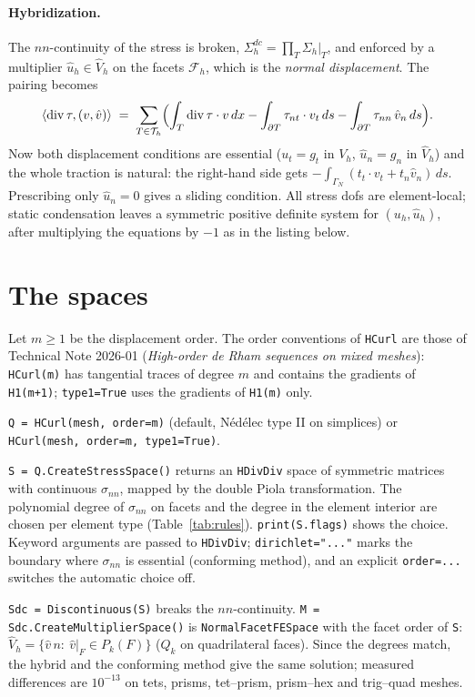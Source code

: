 \documentclass[10pt,a4paper]{article}
\newcommand{\code}[1]{\texttt{#1}}
\newcommand{\Th}{\mathcal{T}_h}
\newcommand{\Fh}{\mathcal{F}_h}
\newcommand{\Div}{\operatorname{div}}
\begin{document}
\paragraph{Hybridization.}
The $nn$-continuity of the stress is broken, $\Sigma_h^{dc}=\prod_T\Sigma_h|_T$, and enforced by a multiplier $\hat u_h\in\hat V_h$ on the facets $\Fh$, which is the \emph{normal displacement}. The pairing becomes
\[
  \langle\Div\tau,(v,\hat v)\rangle \;=\; \sum_{T\in\Th}\Bigl(\int_T \Div\tau\cdot v\,dx - \int_{\partial T}\tau_{nt}\cdot v_t\,ds - \int_{\partial T}\tau_{nn}\,\hat v_n\,ds\Bigr).
\]
Now both displacement conditions are essential ($u_t=g_t$ in $V_h$, $\hat u_n=g_n$ in $\hat V_h$) and the whole traction is natural: the right-hand side gets $-\int_{\Gamma_N}(t_t\cdot v_t+t_n\hat v_n)\,ds$. Prescribing only $\hat u_n=0$ gives a sliding condition.
All stress dofs are element-local; static condensation leaves a symmetric positive definite system for $(u_h,\hat u_h)$, after multiplying the equations by $-1$ as in the listing below.

\section{The spaces}

Let $m\ge1$ be the displacement order. The order conventions of \code{HCurl} are those of Technical Note 2026-01 (\emph{High-order de Rham sequences on mixed meshes}): \code{HCurl(m)} has tangential traces of degree $m$ and contains the gradients of \code{H1(m+1)}; \code{type1=True} uses the gradients of \code{H1(m)} only.

\begin{description}\setlength\itemsep{2pt}
\item[Displacement] \code{Q = HCurl(mesh, order=m)} (default, N\'ed\'elec type II on simplices) or \code{HCurl(mesh, order=m, type1=True)}.
\item[Stress] \code{S = Q.CreateStressSpace()} returns an \code{HDivDiv} space of symmetric matrices with continuous $\sigma_{nn}$, mapped by the double Piola transformation. The polynomial degree of $\sigma_{nn}$ on facets and the degree in the element interior are chosen per element type (Table~\ref{tab:rules}). \code{print(S.flags)} shows the choice. Keyword arguments are passed to \code{HDivDiv}; \code{dirichlet="..."} marks the boundary where $\sigma_{nn}$ is essential (conforming method), and an explicit \code{order=...} switches the automatic choice off.
\item[Hybridization] \code{Sdc = Discontinuous(S)} breaks the $nn$-continuity. \code{M = Sdc.CreateMultiplierSpace()} is \code{NormalFacetFESpace} with the facet order of \code{S}: $\hat V_h=\{\hat v\,n:\ \hat v|_F\in P_k(F)\}$ ($Q_k$ on quadrilateral faces). Since the degrees match, the hybrid and the conforming method give the same solution; measured differences are $10^{-13}$ on tets, prisms, tet--prism, prism--hex and trig--quad meshes.
\end{description}
\end{document}
